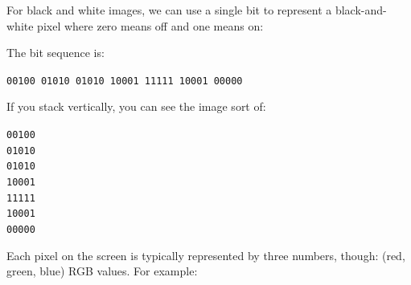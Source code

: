 \documentclass[titlepage]{tufte-book}
\begin{document}
\begin{fullwidth}
For black and white images, we can use a single bit to represent a black-and-white  pixel where zero means off and one means on:


\noindent The bit sequence is:

{\tt 00100 01010 01010 10001 11111 10001 00000}

\noindent If you stack vertically, you can see the image sort of:

{\tt 00100\\
     01010 \\
     01010 \\
     10001 \\
     11111 \\
     10001 \\
     00000}

Each pixel on the screen is typically represented by three numbers, though: (red, green, blue) RGB values. For example:


\end{fullwidth}
\end{document}
